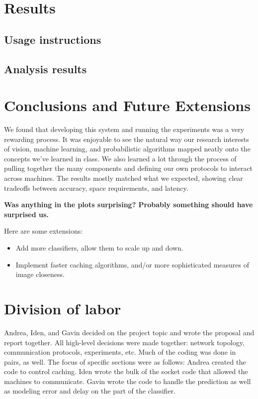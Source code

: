 \documentclass[12pt]{article}
\begin{document}
\section{Results}

\subsection{Usage instructions}
\subsection{Analysis results}

\section{Conclusions and Future Extensions}

We found that developing this system and running the experiments was a very rewarding process.
It was enjoyable to see the natural way our research interests of vision, machine learning, and probabilistic algorithms mapped neatly onto the concepts we've learned in class.
We also learned a lot through the process of pulling together the many components and defining our own protocols to interact across machines.
The results mostly matched what we expected, showing clear tradeoffs between accuracy, space requirements, and latency.

{\bf Was anything in the plots surprising?
Probably something should have surprised us.}

Here are some extensions:
\begin{itemize}
    \item Add more classifiers, allow them to scale up and down.
    \item Implement faster caching algorithms, and/or more sophisticated measures of image closeness.
\end{itemize}

\section{Division of labor}

Andrea, Iden, and Gavin decided on the project topic and wrote the proposal and report together.
All high-level decisions were made together: network topology, communication protocols, experiments, etc.
Much of the coding was done in pairs, as well.
The focus of specific sections were as follows: Andrea created the code to control caching.
Iden wrote the bulk of the socket code that allowed the machines to communicate.
Gavin wrote the code to handle the prediction as well as modeling error and delay on the part of the classifier.
\end{document}
